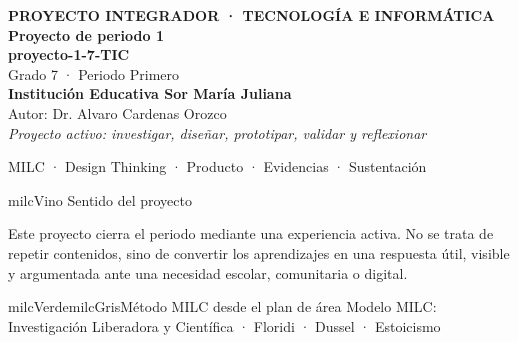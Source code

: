 \documentclass[11pt,letterpaper]{article}
\begin{document}
\thispagestyle{empty}

\vspace*{.85cm}
\begin{tcolorbox}[
  enhanced,colback=milcVino,colframe=milcVino,arc=12mm,width=.86\textwidth,
  boxrule=0pt,left=12mm,right=12mm,top=11mm,bottom=11mm,center,
  overlay={\draw[milcMagenta,line width=2pt,dash pattern=on 9pt off 8pt,rounded corners=10mm]
  ([xshift=7mm,yshift=-7mm]frame.north west) rectangle ([xshift=-7mm,yshift=7mm]frame.south east);}]
  \centering
  {\sffamily\bfseries\color{white}\fontsize{15}{17}\selectfont PROYECTO INTEGRADOR · TECNOLOGÍA E INFORMÁTICA}\\[1.0cm]
  {\sffamily\bfseries\color{white}\fontsize{30}{33}\selectfont Proyecto de periodo 1}\\[3mm]
  {\sffamily\bfseries\color{milcMostaza}\fontsize{25}{28}\selectfont proyecto-1-7-TIC}\\[8mm]
  {\sffamily\color{white}\Large Grado 7 · Periodo Primero}\\[1.0cm]
  {\sffamily\bfseries\color{white}\large Institución Educativa Sor María Juliana}\\[2mm]
  {\sffamily\color{white}Autor: Dr. Alvaro Cardenas Orozco}\\[4mm]
  {\sffamily\itshape\color{white}Proyecto activo: investigar, diseñar, prototipar, validar y reflexionar}
\end{tcolorbox}
\vfill
\begin{tcolorbox}[enhanced,colback=milcVino!72!black,colframe=milcVino!72!black,arc=5mm,boxrule=0pt,width=.86\textwidth,left=6mm,right=6mm,top=4mm,bottom=4mm,center]
{\color{white}\sffamily\small MILC · Design Thinking · Producto · Evidencias · Sustentación}
\end{tcolorbox}

\newpage
\begin{titlebox}{milcVino}
Sentido del proyecto
\end{titlebox}
\begin{multicols}{2}
Este proyecto cierra el periodo mediante una experiencia activa. No se trata de repetir contenidos, sino de convertir los aprendizajes en una respuesta útil, visible y argumentada ante una necesidad escolar, comunitaria o digital.

\columnbreak
\begin{softbox}{milcVerde}{milcGris}{Método MILC desde el plan de área}
Modelo MILC: Investigación Liberadora y Científica · Floridi · Dussel · Estoicismo
\end{softbox}
\end{multicols}
\end{document}
